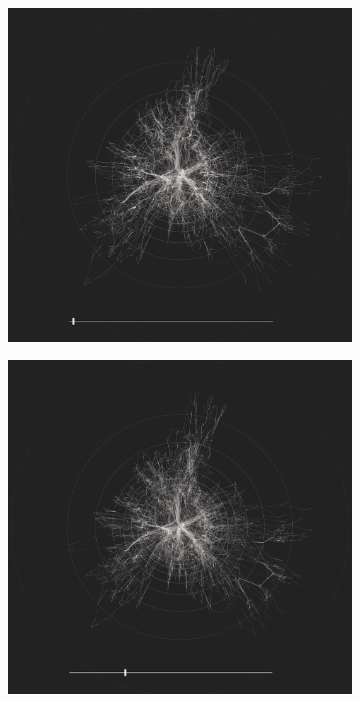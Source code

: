 \begin{figure}[H]
    \centering
     \begin{subfigure}[b]{.49\textwidth}
        \centering
    \includegraphics[width=\textwidth]{figures_c1/layout/confluent/0.png}
    \caption{}
    \end{subfigure}
    \centering
     \begin{subfigure}[b]{.49\textwidth}
        \centering
    \includegraphics[width=\textwidth]{figures_c1/layout/confluent/25.png} \caption{}

\end{subfigure}
\end{figure}
